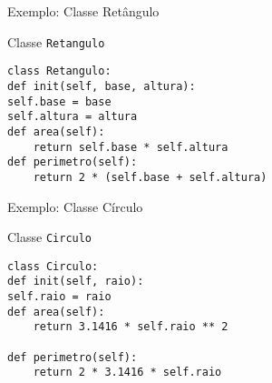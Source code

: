 \begin{frame}[fragile]{Exemplo: Classe Retângulo}

    \begin{block}{Classe \texttt{Retangulo}}
        \begin{verbatim}
class Retangulo:
def init(self, base, altura):
self.base = base
self.altura = altura
def area(self):
    return self.base * self.altura
def perimetro(self):
    return 2 * (self.base + self.altura)
\end{verbatim}
    \end{block}
\end{frame}
\begin{frame}[fragile]{Exemplo: Classe Círculo}

    \begin{block}{Classe \texttt{Circulo}}
        \begin{verbatim}
class Circulo:
def init(self, raio):
self.raio = raio
def area(self):
    return 3.1416 * self.raio ** 2

def perimetro(self):
    return 2 * 3.1416 * self.raio
\end{verbatim}
    \end{block}

\end{frame}
